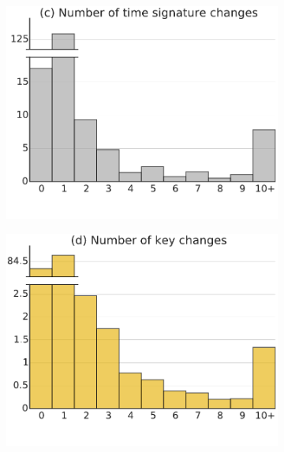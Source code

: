 \documentclass{article}
\begin{document}
\begin{figure}
\begin{subfigure}{.23\textwidth}
        \includegraphics[width=\textwidth]{n_signatures.pdf}
    \end{subfigure}
    \begin{subfigure}{.23\textwidth}
        \includegraphics[width=\textwidth]{n_keys.pdf}
    \end{subfigure}


\end{figure}
\end{document}
